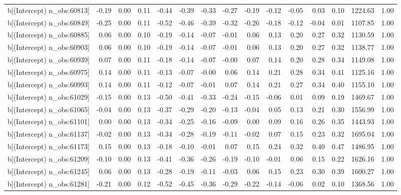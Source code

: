 \begin{table}[ht]
\begin{tabular}{rrrrrrrrrrrrrrr}
  b[(Intercept) n\_obs:60813] & -0.19 & 0.00 & 0.11 & -0.44 & -0.39 & -0.33 & -0.27 & -0.19 & -0.12 & -0.05 & 0.03 & 0.10 & 1224.63 & 1.00 \\ 
  b[(Intercept) n\_obs:60849] & -0.25 & 0.00 & 0.11 & -0.52 & -0.46 & -0.39 & -0.32 & -0.26 & -0.18 & -0.12 & -0.04 & 0.01 & 1107.85 & 1.00 \\ 
  b[(Intercept) n\_obs:60885] & 0.06 & 0.00 & 0.10 & -0.19 & -0.14 & -0.07 & -0.01 & 0.06 & 0.13 & 0.20 & 0.27 & 0.32 & 1130.59 & 1.00 \\ 
  b[(Intercept) n\_obs:60903] & 0.06 & 0.00 & 0.10 & -0.19 & -0.14 & -0.07 & -0.01 & 0.06 & 0.13 & 0.20 & 0.27 & 0.32 & 1138.77 & 1.00 \\ 
  b[(Intercept) n\_obs:60939] & 0.07 & 0.00 & 0.11 & -0.18 & -0.14 & -0.07 & -0.00 & 0.07 & 0.14 & 0.20 & 0.28 & 0.34 & 1149.08 & 1.00 \\ 
  b[(Intercept) n\_obs:60975] & 0.14 & 0.00 & 0.11 & -0.13 & -0.07 & -0.00 & 0.06 & 0.14 & 0.21 & 0.28 & 0.34 & 0.41 & 1125.16 & 1.00 \\ 
  b[(Intercept) n\_obs:60993] & 0.14 & 0.00 & 0.11 & -0.12 & -0.07 & -0.01 & 0.07 & 0.14 & 0.21 & 0.27 & 0.34 & 0.40 & 1155.10 & 1.00 \\ 
  b[(Intercept) n\_obs:61029] & -0.15 & 0.00 & 0.13 & -0.50 & -0.41 & -0.33 & -0.24 & -0.15 & -0.06 & 0.01 & 0.09 & 0.19 & 1469.67 & 1.00 \\ 
  b[(Intercept) n\_obs:61065] & -0.04 & 0.00 & 0.13 & -0.37 & -0.29 & -0.20 & -0.13 & -0.04 & 0.05 & 0.13 & 0.21 & 0.30 & 1556.99 & 1.00 \\ 
  b[(Intercept) n\_obs:61101] & 0.00 & 0.00 & 0.13 & -0.34 & -0.25 & -0.16 & -0.09 & 0.00 & 0.09 & 0.16 & 0.26 & 0.35 & 1443.93 & 1.00 \\ 
  b[(Intercept) n\_obs:61137] & -0.02 & 0.00 & 0.13 & -0.34 & -0.28 & -0.19 & -0.11 & -0.02 & 0.07 & 0.15 & 0.23 & 0.32 & 1695.04 & 1.00 \\ 
  b[(Intercept) n\_obs:61173] & 0.15 & 0.00 & 0.13 & -0.18 & -0.10 & -0.01 & 0.07 & 0.15 & 0.24 & 0.32 & 0.40 & 0.47 & 1486.95 & 1.00 \\ 
  b[(Intercept) n\_obs:61209] & -0.10 & 0.00 & 0.13 & -0.41 & -0.36 & -0.26 & -0.19 & -0.10 & -0.01 & 0.06 & 0.15 & 0.22 & 1626.16 & 1.00 \\ 
  b[(Intercept) n\_obs:61245] & 0.06 & 0.00 & 0.13 & -0.28 & -0.19 & -0.11 & -0.03 & 0.06 & 0.15 & 0.23 & 0.30 & 0.39 & 1600.27 & 1.00 \\ 
  b[(Intercept) n\_obs:61281] & -0.21 & 0.00 & 0.12 & -0.52 & -0.45 & -0.36 & -0.29 & -0.22 & -0.14 & -0.06 & 0.02 & 0.10 & 1368.56 & 1.00 \\ 

\end{tabular}
\end{table}

